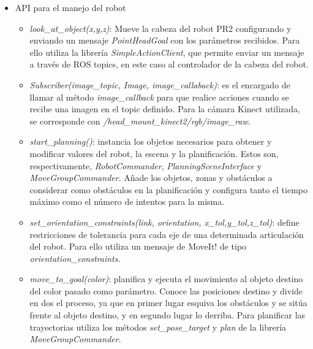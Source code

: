 \documentclass[12pt,spanish,chapterprefix, numbers=noenddot]{book}
\numberwithin{equation}{section}
\numberwithin{figure}{section}
\begin{document}
\begin{itemize}
\item{API para el manejo del robot}
    \begin{itemize}
    \item \textit{look\_at\_object(x,y,z)}: Mueve la cabeza del robot PR2 configurando y enviando un mensaje \textit{PointHeadGoal} con los parámetros recibidos. Para ello utiliza la librería \textit{SimpleActionClient}, que permite enviar un mensaje a través de ROS topics, en este caso al controlador de la cabeza del robot. 
    \item \textit{Subscriber(image\_topic, Image, image\_callaback)}: es el encargado de llamar al método \textit{image\_callback} para que realice acciones cuando se recibe una imagen en el topic definido. Para la cámara Kinect utilizada, se corresponde con \textit{/head\_mount\_kinect2/rgb/image\_raw}.
    \item \textit{start\_planning()}: instancia los objetos necesarios para obtener y modificar valores del robot, la escena y la planificación. Estos son, respectivamente, \textit{RobotCommander}, \textit{PlanningSceneInterface} y \textit{MoveGroupCommander}. Añade los objetos, zonas y obstáculos a considerar como obstáculos en la planificación y configura tanto el tiempo máximo como el número de intentos para la misma. 
    \item \textit{set\_orientation\_constraints(link, orientation, x\_tol,y\_tol,z\_tol)}: define restricciones de tolerancia para cada eje de una determinada articulación del robot. Para ello utiliza un mensaje de MoveIt! de tipo \textit{orientation\_constraints}.
    \item \textit{move\_to\_goal(color)}: planifica y ejecuta el movimiento al objeto destino del color pasado como parámetro. Conoce las posiciones destino y divide en dos el proceso, ya que en primer lugar esquiva los obstáculos y se sitúa frente al objeto destino, y en segundo lugar lo derriba. Para planificar las trayectorias utiliza los métodos \textit{set\_pose\_target} y \textit{plan} de la librería \textit{MoveGroupCommander}.
    \end{itemize}
\end{itemize}
\end{document}
